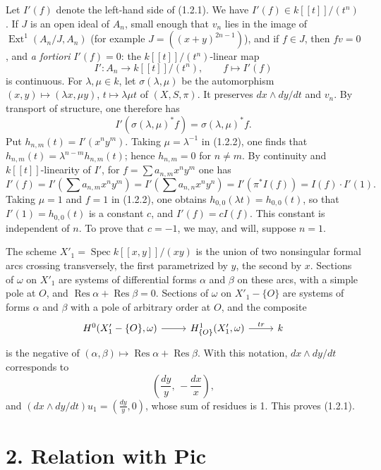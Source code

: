 \documentclass[11pt,leqno]{article}
\DeclareMathOperator{\Spec}{Spec}
\DeclareMathOperator{\Ext}{Ext}
\DeclareMathOperator{\Res}{Res}
\begin{document}
Let $I'(f)$ denote the left-hand side of (1.2.1). We have $I'(f)\in k[[t]]/(t^n)$. If $J$ is an open ideal of $A_n$, small enough that $v_n$ lies in the image of $\Ext^1(A_n/J,A_n)$ (for example $J=((x+y)^{2n-1})$), and if $f\in J$, then $fv=0$, and \emph{a fortiori} $I'(f)=0$: the $k[[t]]/(t^n)$-linear map
\[
        I':A_n\longrightarrow k[[t]]/(t^n),\qquad f\longmapsto I'(f)
\]
is continuous.
\clearpage
For $\lambda,\mu\in k$, let $\sigma(\lambda,\mu)$ be the automorphism $(x,y)\mapsto(\lambda x,\mu y)$, $t\mapsto\lambda\mu t$ of $(X,S,\pi)$. It preserves $dx\wedge dy/dt$ and $v_n$. By transport of structure, one therefore has
\begin{equation}
        I'(\sigma(\lambda,\mu)^*f)=\sigma(\lambda,\mu)^*f. \tag{1.2.2}
\end{equation}
Put $h_{n,m}(t)=I'(x^ny^m)$. Taking $\mu=\lambda^{-1}$ in (1.2.2), one finds that $h_{n,m}(t)=\lambda^{n-m}h_{n,m}(t)$; hence $h_{n,m}=0$ for $n\ne m$. By continuity and $k[[t]]$-linearity of $I'$, for $f=\sum a_{n,m}x^ny^m$ one has
\[
        I'(f)=I'\left(\sum a_{n,m}x^ny^m\right)
             =I'\left(\sum a_{n,n}x^ny^n\right)
             =I'(\pi^*I(f))=I(f)\cdot I'(1).
\]
Taking $\mu=1$ and $f=1$ in (1.2.2), one obtains $h_{0,0}(\lambda t)=h_{0,0}(t)$, so that $I'(1)=h_{0,0}(t)$ is a constant $c$, and $I'(f)=cI(f)$. This constant is independent of $n$. To prove that $c=-1$, we may, and will, suppose $n=1$.

The scheme $X'_1=\Spec k[[x,y]]/(xy)$ is the union of two nonsingular formal arcs crossing transversely, the first parametrized by $y$, the second by $x$. Sections of $\omega$ on $X'_1$ are systems of differential forms $\alpha$ and $\beta$ on these arcs, with a simple pole at $O$, and $\Res\alpha+\Res\beta=0$. Sections of $\omega$ on $X'_1-\{O\}$ are systems of forms $\alpha$ and $\beta$ with a pole of arbitrary order at $O$, and the composite
\[
\begin{tikzcd}[column sep=2.5em]
H^0(X'_1-\{O\},\omega) \arrow[r] & H^1_{\{O\}}(X'_1,\omega) \arrow[r,"tr"] & k
\end{tikzcd}
\]
is the negative of $(\alpha,\beta)\mapsto\Res\alpha+\Res\beta$. With this notation, $dx\wedge dy/dt$ corresponds to
\[
        \left(\frac{dy}{y},\,-\frac{dx}{x}\right),
\]
and $(dx\wedge dy/dt)u_1=\left(\frac{dy}{y},0\right)$, whose sum of residues is 1. This proves (1.2.1).

\section*{2. Relation with Pic}
\end{document}
